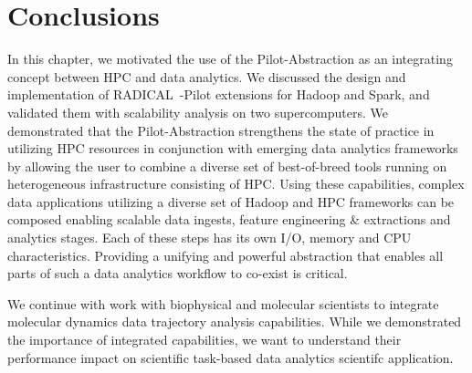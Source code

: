 \section{Conclusions}
\label{sec:hpc_hadoop_concl}
In this chapter, we motivated the use of the Pilot-Abstraction as an integrating concept between HPC and data analytics.
We discussed the design and implementation of RADICAL~-Pilot extensions for Hadoop and Spark, and validated them with scalability analysis on two supercomputers.
We demonstrated that the Pilot-Abstraction strengthens the state of practice in utilizing HPC resources in conjunction with emerging data analytics frameworks by allowing the user to combine a diverse set of best-of-breed tools running on heterogeneous infrastructure consisting of HPC.
Using these capabilities, complex data applications utilizing a diverse set of Hadoop and HPC frameworks can be composed enabling scalable data ingests, feature engineering \& extractions and analytics stages.
Each of these steps has its own I/O, memory and CPU characteristics. 
Providing a unifying and powerful abstraction that enables all parts of such a data analytics workflow to co-exist is critical.

We continue with work with biophysical and molecular scientists to integrate molecular dynamics data trajectory analysis capabilities.
While we demonstrated the importance of integrated capabilities, we want to understand their performance impact on scientific task-based data analytics scientifc application.


